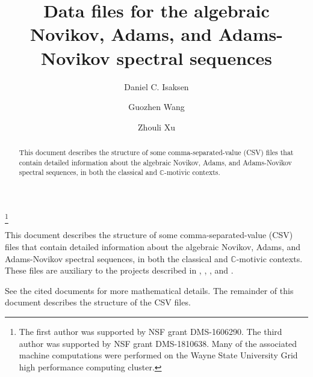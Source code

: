 \documentclass{amsart}
\newcommand{\C}         {\mathbb{C}}
\begin{document}
\title[Spectral sequence data files]
{Data files for the algebraic Novikov, Adams, and Adams-Novikov
spectral sequences}

\author{Daniel C. Isaksen}
\address{
Department of Mathematics, 
Wayne State University, 
Detroit, MI 48202, USA}

\thanks{The first author was supported by NSF grant
DMS-1606290. The third author was supported by NSF grant DMS-1810638.
Many of the associated machine computations were performed on the
Wayne State University Grid high performance computing cluster.}

\author{Guozhen Wang}
\address{Shanghai Center for Mathematical Sciences, Fudan University, Shanghai, China, 200433}

\author{Zhouli Xu}
\address{Department of Mathematics, Massachusetts Institute of Technology, Cambridge, MA 02139}



\begin{abstract}
This document describes the structure of some comma-separated-value
(CSV) files that contain detailed information about the algebraic
Novikov, Adams, and Adams-Novikov spectral sequences, in both the
classical and $\C$-motivic contexts.
\end{abstract}

\maketitle



This document describes the structure of some comma-separated-value
(CSV) files that contain detailed information about the algebraic
Novikov, Adams, and Adams-Novikov spectral sequences, in both the
classical and $\C$-motivic contexts.
These files are auxiliary to the projects described in
\cite{IWX19b}, \cite{IWX19a}, \cite{IWX19c}, and \cite{IWX19d}.

See the cited documents for more mathematical details.
The remainder of this document describes the structure of the 
CSV files.
\end{document}
